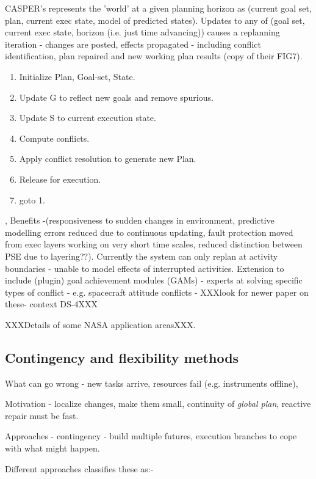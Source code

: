 CASPER's represents the 'world' at a given planning horizon as (current goal set, plan, current exec state, model of predicted states). Updates to any of (goal set, current exec state, horizon (i.e. just time advancing)) causes a replanning iteration - changes are posted, effects propagated - including conflict identification, plan repaired and new working plan results (copy of their FIG7).

\begin{enumerate}
\item Initialize Plan, Goal-set, State.
\item Update G to reflect new goals and remove spurious.
\item Update S to current execution state.
\item Compute conflicts.
\item Apply conflict resolution to generate new Plan.
\item Release for execution.
\item goto 1.
\end{enumerate}

\cite{chien98integrated}, Benefits -(responsiveness to sudden changes in environment, predictive modelling errors reduced due to continuous updating, fault protection moved from exec layers working on very short time scales, reduced distinction between PSE due to layering??). Currently the system can only replan at activity boundaries - unable to model effects of interrupted activities. Extension to include (plugin) goal achievement modules (GAMs) - experts at solving specific types of conflict - e.g. spacecraft attitude conflicts - XXXlook for newer paper on these- context DS-4XXX


XXXDetails of some NASA application areasXXX.

%
%
\subsection{Contingency and flexibility methods}

What can go wrong - new tasks arrive, resources fail (e.g. instruments offline),

Motivation - localize changes, make them small, continuity of \emph{global plan}, reactive repair must be fast. 

Approaches - contingency - build multiple futures, execution branches to cope with what might happen. 

Different approaches \cite{policella03flexible} classifies these as:-

